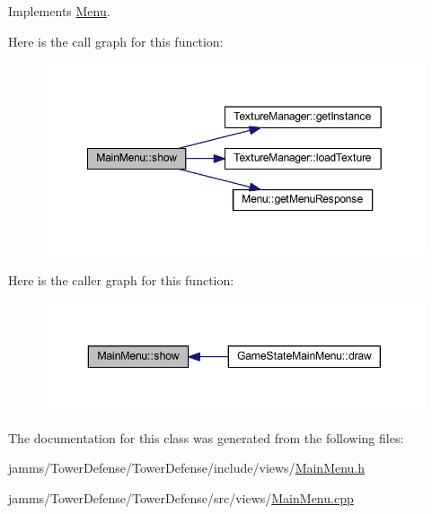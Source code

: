 Implements \hyperlink{class_menu_a36605c91aee63d4be6a85b3911a7725b}{Menu}.



Here is the call graph for this function\+:
\nopagebreak
\begin{figure}[H]
\begin{center}
\leavevmode
\includegraphics[width=349pt]{class_main_menu_a4d84c0a0b817cbff4faf67274dadcc1c_cgraph}
\end{center}
\end{figure}




Here is the caller graph for this function\+:
\nopagebreak
\begin{figure}[H]
\begin{center}
\leavevmode
\includegraphics[width=343pt]{class_main_menu_a4d84c0a0b817cbff4faf67274dadcc1c_icgraph}
\end{center}
\end{figure}




The documentation for this class was generated from the following files\+:\begin{DoxyCompactItemize}
\item 
jamms/\+Tower\+Defense/\+Tower\+Defense/include/views/\hyperlink{_main_menu_8h}{Main\+Menu.\+h}\item 
jamms/\+Tower\+Defense/\+Tower\+Defense/src/views/\hyperlink{_main_menu_8cpp}{Main\+Menu.\+cpp}\end{DoxyCompactItemize}
